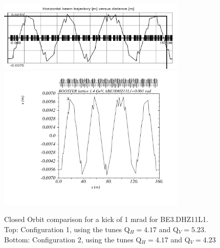 \documentclass[11pt,letter,english]{article}
\begin{document}
\begin{figure}[!hbtp]
  \begin{center}
    \includegraphics[width=0.8\textwidth]{figs/LINC-BE_DHZ11L1.png}
    \includegraphics[width=0.8\textwidth]{figs/psb_orbit_kBE3DHZ11L1at0p001rad_l2014tobias.pdf}
    \caption{Closed Orbit comparison for a kick of 1 mrad for BE3.DHZ11L1. Top: Configuration 1, using the tunes Q$_H=4.17$ and Q$_V=5.23$. Bottom: Configuration 2, using the tunes Q$_H=4.17$ and Q$_V=4.23$}
    \label{fig:BE_DHZ11L1}
  \end{center}
\end{figure}
\end{document}
